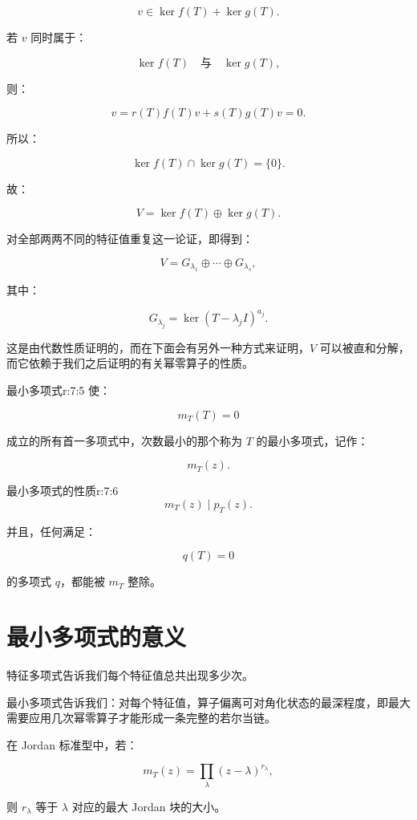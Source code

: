 \[
v
\in
\ker f(T)+\ker g(T).
\]

若 $v$ 同时属于：

\[
\ker f(T)
\quad\text{与}\quad
\ker g(T),
\]

则：

\[
v
=
r(T)f(T)v+s(T)g(T)v
=
0.
\]

所以：

\[
\ker f(T)\cap\ker g(T)=\{0\}.
\]

故：

\[
V
=
\ker f(T)\oplus\ker g(T).
\]

对全部两两不同的特征值重复这一论证，即得到：

\[
V
=
G_{\lambda_1}\oplus\cdots\oplus G_{\lambda_s},
\]

其中：

\[
G_{\lambda_j}
=
\ker(T-\lambda_jI)^{a_j}.
\]

\begin{jinsight}
这是由代数性质证明的，而在下面会有另外一种方式来证明，$V$ 可以被直和分解，而它依赖于我们之后证明的有关幂零算子的性质。
\end{jinsight}

\begin{jdefn}{最小多项式}{r:7:5}
使：

\[
m_T(T)=0
\]

成立的所有首一多项式中，次数最小的那个称为 $T$ 的最小多项式，记作：

\[
m_T(z).
\]
\end{jdefn}

\begin{jprop}{最小多项式的性质}{r:7:6}
\[
m_T(z)\mid p_T(z).
\]

并且，任何满足：

\[
q(T)=0
\]

的多项式 $q$，都能被 $m_T$ 整除。
\end{jprop}

\section{最小多项式的意义}

特征多项式告诉我们每个特征值总共出现多少次。

最小多项式告诉我们：对每个特征值，算子偏离可对角化状态的最深程度，即最大需要应用几次幂零算子才能形成一条完整的若尔当链。

在 Jordan 标准型中，若：

\[
m_T(z)
=
\prod_\lambda(z-\lambda)^{r_\lambda},
\]

则 $r_\lambda$ 等于 $\lambda$ 对应的最大 Jordan 块的大小。
